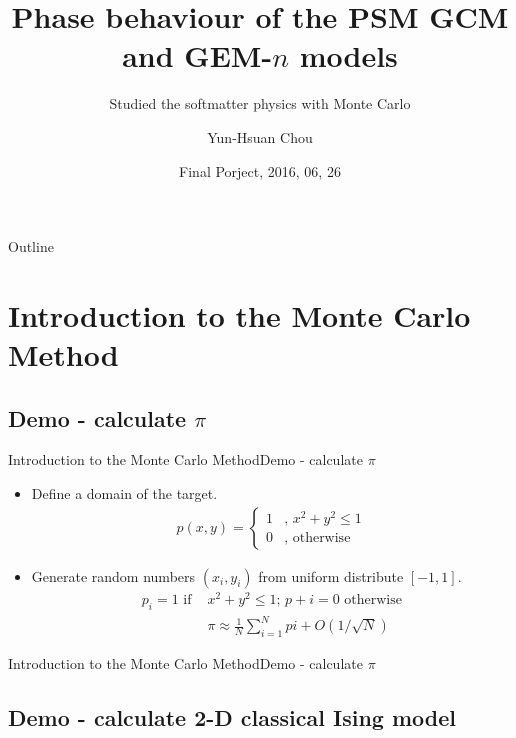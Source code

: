\documentclass{beamer}
\title{Phase behaviour of the PSM GCM and GEM-$n$ models}
\subtitle{Studied the softmatter physics with Monte Carlo}
\author{Yun-Hsuan Chou}
\institute[NTU] %
{
	\inst{1}%
	Department of Pysics\\
	National Taiwan University
}
\date{Final Porject, 2016, 06, 26}
\begin{document}
\begin{frame}
\titlepage
\end{frame}

\begin{frame}{Outline}
\tableofcontents
\end{frame}

\section{Introduction to the Monte Carlo Method}

\subsection{Demo - calculate $\pi$}

\begin{frame}{Introduction to the Monte Carlo Method}{Demo - calculate $\pi$}
\begin{itemize}
\item {
	Define a domain of the target.
	\begin{align}
		p(x,y) = \begin{cases}
			1 & \text{, } x^2 + y^2 \leq 1 \\
			0 & \text{, otherwise} 
		\end{cases}
	\end{align}
}
\item {
	Generate random numbers $(x_i, y_i)$ from uniform distribute $[-1, 1]$.
	\begin{align}	
		p_i = 1 \text{ if } &x^2+y^2 \leq 1\text{; } p+i = 0 \text{ otherwise} \\
		&\pi \approx \frac{1}{N} \sum_{i=1}^{N} pi + O( 1 / \sqrt{N})
	\end{align}
}
\end{itemize}
\end{frame}

\begin{frame}{Introduction to the Monte Carlo Method}{Demo - calculate $\pi$}
\end{frame}

\subsection{Demo - calculate 2-D classical Ising model}
\end{document}
